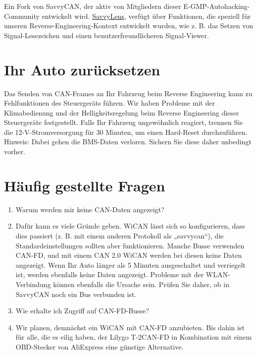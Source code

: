 \documentclass[superscriptaddress,onecolumn,floatfix]{revtex4-2}
\begin{document}
Ein Fork von SavvyCAN, der aktiv von Mitgliedern dieser E-GMP-Autohacking-Community entwickelt wird. \href{https://github.com/SuperSuave/SavvyLens}{SavvyLens}, verfügt über Funktionen, die speziell für unseren Reverse-Engineering-Kontext entwickelt wurden, wie z. B. das Setzen von Signal-Lesezeichen und einen benutzerfreundlicheren Signal-Viewer.

\section{Ihr Auto zurücksetzen}

Das Senden von CAN-Frames an Ihr Fahrzeug beim Reverse Engineering kann zu Fehlfunktionen des Steuergeräts führen. Wir haben Probleme mit der Klimabedienung und der Helligkeitsregelung beim Reverse Engineering dieser Steuergeräte festgestellt. Falls Ihr Fahrzeug ungewöhnlich reagiert, trennen Sie die 12-V-Stromversorgung für 30 Minuten, um einen Hard-Reset durchzuführen. Hinweis: Dabei gehen die BMS-Daten verloren. Sichern Sie diese daher unbedingt vorher.

\section{Häufig gestellte Fragen}
\begin{enumerate}
  \item[Q:] Warum werden mir keine CAN-Daten angezeigt?
  \item[A:] Dafür kann es viele Gründe geben. WiCAN lässt sich so konfigurieren, dass dies passiert (z. B. mit einem anderen Protokoll als „savvycan“), die Standardeinstellungen sollten aber funktionieren. Manche Busse verwenden CAN-FD, und mit einem CAN 2.0 WiCAN werden bei diesen keine Daten angezeigt. Wenn Ihr Auto länger als 5 Minuten ausgeschaltet und verriegelt ist, werden ebenfalls keine Daten angezeigt. Probleme mit der WLAN-Verbindung können ebenfalls die Ursache sein. Prüfen Sie daher, ob in SavvyCAN noch ein Bus verbunden ist.
  \item[Q:] Wie erhalte ich Zugriff auf CAN-FD-Busse?
  \item[A:] Wir planen, demnächst ein WiCAN mit CAN-FD anzubieten. Bis dahin ist für alle, die es eilig haben, der Lilygo T-2CAN-FD in Kombination mit einem OBD-Stecker von AliExpress eine günstige Alternative.
\end{enumerate}
\appendix 

{}
\end{document}
